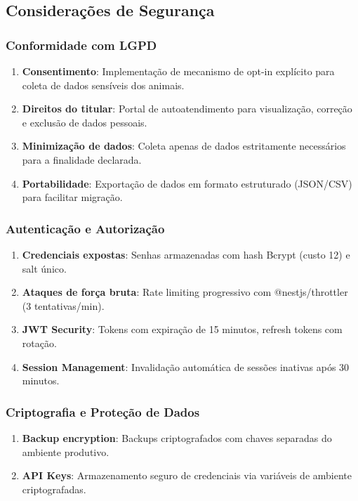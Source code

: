 \documentclass[12pt, a4paper]{article}
\begin{document}
\begin{spacing}{1.5}
\begin{spacing}{1.5}
\subsection{Considerações de Segurança}

\subsubsection{Conformidade com LGPD}
\begin{spacing}{1.5}
\begin{enumerate}[label=\alph*)]
    \item \textbf{Consentimento}: Implementação de mecanismo de opt-in explícito para coleta de dados sensíveis dos animais.
    \item \textbf{Direitos do titular}: Portal de autoatendimento para visualização, correção e exclusão de dados pessoais.
    \item \textbf{Minimização de dados}: Coleta apenas de dados estritamente necessários para a finalidade declarada.
    \item \textbf{Portabilidade}: Exportação de dados em formato estruturado (JSON/CSV) para facilitar migração.
\end{enumerate}
\end{spacing}

\subsubsection{Autenticação e Autorização}
\begin{spacing}{1.5}
\begin{enumerate}[label=\alph*)]
    \item \textbf{Credenciais expostas}: Senhas armazenadas com hash Bcrypt (custo 12) e salt único.
    \item \textbf{Ataques de força bruta}: Rate limiting progressivo com @nestjs/throttler (3 tentativas/min).
    \item \textbf{JWT Security}: Tokens com expiração de 15 minutos, refresh tokens com rotação.
    \item \textbf{Session Management}: Invalidação automática de sessões inativas após 30 minutos.
\end{enumerate}
\end{spacing}

\subsubsection{Criptografia e Proteção de Dados}
\begin{spacing}{1.5}
\begin{enumerate}[label=\alph*)]
    \item \textbf{Backup encryption}: Backups criptografados com chaves separadas do ambiente produtivo.
    \item \textbf{API Keys}: Armazenamento seguro de credenciais via variáveis de ambiente criptografadas.
\end{enumerate}
\end{spacing}


\end{spacing}
\end{spacing}
\end{document}
